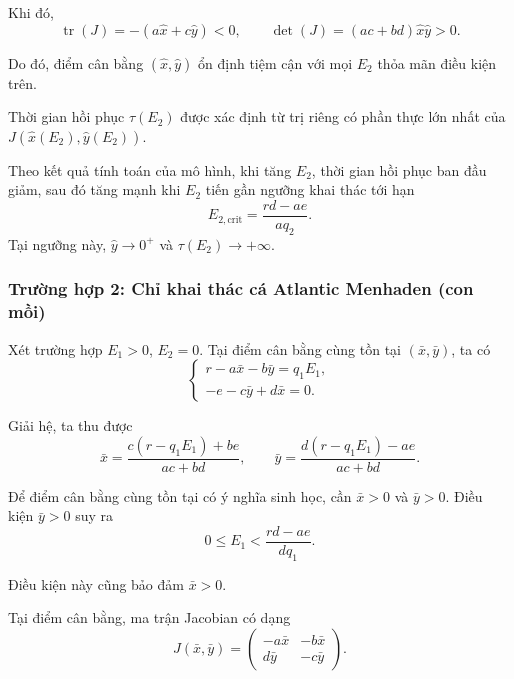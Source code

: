 Khi đó,
\[
    \operatorname{tr}(J)=-(a\hat{x}+c\hat{y})<0,
    \qquad
    \det(J)=(ac+bd)\hat{x}\hat{y}>0.
\]

Do đó, điểm cân bằng $(\hat{x},\hat{y})$ ổn định
tiệm cận với mọi $E_2$ thỏa mãn điều kiện trên.

Thời gian hồi phục $\tau(E_2)$ được xác định
từ trị riêng có phần thực lớn nhất của
$J(\hat{x}(E_2),\hat{y}(E_2))$.

Theo kết quả tính toán của mô hình, khi tăng $E_2$,
thời gian hồi phục ban đầu giảm, sau đó tăng mạnh
khi $E_2$ tiến gần ngưỡng khai thác tới hạn
\[
    E_{2,\mathrm{crit}}=\frac{rd-ae}{aq_2}.
\]
Tại ngưỡng này, $\hat{y}\to0^+$ và
$\tau(E_2)\to+\infty$.



\subsubsection{Trường hợp 2: Chỉ khai thác cá Atlantic Menhaden
(con mồi)}

Xét trường hợp $E_1>0$, $E_2=0$. Tại điểm cân bằng
cùng tồn tại $(\bar{x},\bar{y})$, ta có
\[
    \begin{cases}
        r-a\bar{x}-b\bar{y}=q_1E_1,\\
        -e-c\bar{y}+d\bar{x}=0.
    \end{cases}
\]

Giải hệ, ta thu được
\[
    \bar{x}=\frac{c(r-q_1E_1)+be}{ac+bd},
    \qquad
    \bar{y}=\frac{d(r-q_1E_1)-ae}{ac+bd}.
\]

Để điểm cân bằng cùng tồn tại có ý nghĩa sinh học,
cần $\bar{x}>0$ và $\bar{y}>0$.
Điều kiện $\bar{y}>0$ suy ra
\begin{equation}
    0\leq E_1<\frac{rd-ae}{dq_1}.
\end{equation}

Điều kiện này cũng bảo đảm $\bar{x}>0$.

Tại điểm cân bằng, ma trận Jacobian có dạng
\[
    J(\bar{x},\bar{y})=
    \begin{pmatrix}
        -a\bar{x} & -b\bar{x}\\
        d\bar{y} & -c\bar{y}
    \end{pmatrix}.
\]

